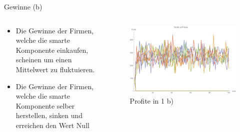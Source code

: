 \documentclass[xcolor={dvipsnames},10pt]{beamer}
\begin{document}
\begin{frame}{Gewinne (b)}
\begin{columns}[T]
    \begin{column}{.3\textwidth}
      \begin{itemize}
      \item Die Gewinne der Firmen, welche die smarte Komponente einkaufen,
            scheinen um einen Mittelwert zu fluktuieren.
      \item Die Gewinne der Firmen, welche die smarte Komponente selber herstellen,
            sinken und erreichen den Wert Null
      \end{itemize}
      \end{column}
      \begin{column}{.7\textwidth}
      \begin{figure}[t]
            \centering
            \includegraphics[scale=0.35]{../Plots/profit1b}
            \caption{Profite in 1 b)}
            \label{fig:profit1b}
       \end{figure}
    \end{column}
  \end{columns}
\end{frame}
\end{document}
